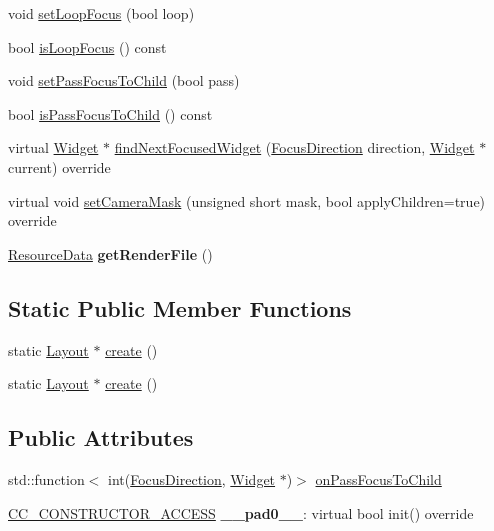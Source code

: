 \begin{DoxyCompactItemize}
void \hyperlink{classui_1_1Layout_aff48ab68a81a6c065c3e7aaed4eafa29}{set\+Loop\+Focus} (bool loop)
\item 
bool \hyperlink{classui_1_1Layout_a68b58a782140967c44016b1060c4c111}{is\+Loop\+Focus} () const
\item 
void \hyperlink{classui_1_1Layout_a5188ac4854ffba6818e19bfd0325828f}{set\+Pass\+Focus\+To\+Child} (bool pass)
\item 
bool \hyperlink{classui_1_1Layout_af9a1038bbc2d4429cd4d37d5b44b83ce}{is\+Pass\+Focus\+To\+Child} () const
\item 
virtual \hyperlink{classui_1_1Widget}{Widget} $\ast$ \hyperlink{classui_1_1Layout_ae19c0e9a2c478634667f1241db1df0c4}{find\+Next\+Focused\+Widget} (\hyperlink{classui_1_1Widget_a8ae8e8fc793a04a87584205cd1e8a8a5}{Focus\+Direction} direction, \hyperlink{classui_1_1Widget}{Widget} $\ast$current) override
\item 
virtual void \hyperlink{classui_1_1Layout_a7468a69a70aa481c7a429db365f0362c}{set\+Camera\+Mask} (unsigned short mask, bool apply\+Children=true) override
\item 
\mbox{\label{classui_1_1Layout_ac08d4da75c1844c005b542cdf495fd13}} 
\hyperlink{structResourceData}{Resource\+Data} {\bfseries get\+Render\+File} ()
\end{DoxyCompactItemize}
\subsection*{Static Public Member Functions}
\begin{DoxyCompactItemize}
\item 
static \hyperlink{classui_1_1Layout}{Layout} $\ast$ \hyperlink{classui_1_1Layout_a1a54041ae0a3da6ed2f538c1046ec9da}{create} ()
\item 
static \hyperlink{classui_1_1Layout}{Layout} $\ast$ \hyperlink{classui_1_1Layout_a57baf63a0209d87f9ab46b18b6655ec9}{create} ()
\end{DoxyCompactItemize}
\subsection*{Public Attributes}
\begin{DoxyCompactItemize}
\item 
std\+::function$<$ int(\hyperlink{classui_1_1Widget_a8ae8e8fc793a04a87584205cd1e8a8a5}{Focus\+Direction}, \hyperlink{classui_1_1Widget}{Widget} $\ast$)$>$ \hyperlink{classui_1_1Layout_a9cbbd61aa645a9e719d34f824e83a249}{on\+Pass\+Focus\+To\+Child}
\item 
\mbox{\label{classui_1_1Layout_abd49f008303a7af1afd06559d9d17897}} 
\hyperlink{_2cocos2d_2cocos_2base_2ccConfig_8h_a25ef1314f97c35a2ed3d029b0ead6da0}{C\+C\+\_\+\+C\+O\+N\+S\+T\+R\+U\+C\+T\+O\+R\+\_\+\+A\+C\+C\+E\+SS} {\bfseries \+\_\+\+\_\+pad0\+\_\+\+\_\+}\+: virtual bool init() override
\end{DoxyCompactItemize}

